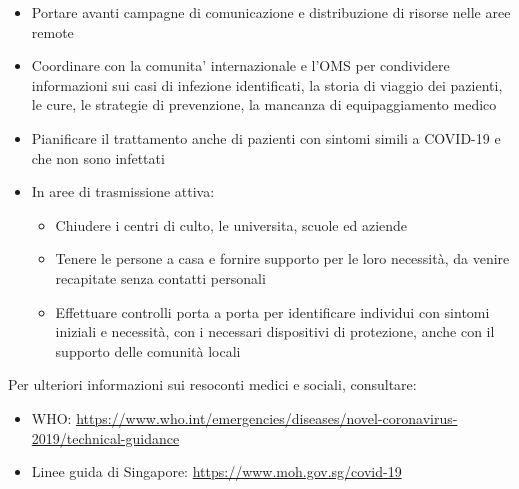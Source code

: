 \documentclass[onecolumn,journal]{IEEEtran}
\begin{document}
\begin{multicols}{2}
\begin{itemize}
\item Portare avanti campagne di comunicazione e distribuzione di risorse nelle aree remote
\item Coordinare con la comunita’ internazionale e l’OMS per condividere informazioni sui casi di infezione identificati, la storia di viaggio dei pazienti, le cure, le strategie di prevenzione, la mancanza di equipaggiamento medico
\item Pianificare il trattamento anche di pazienti con sintomi simili a COVID-19 e che non sono infettati
\item In aree di trasmissione attiva:
  \begin{itemize}
  \item Chiudere i centri di culto, le universita, scuole ed aziende
  \item Tenere le persone a casa e fornire supporto per le loro necessità, da venire recapitate senza contatti personali
  \item Effettuare controlli porta a porta per identificare individui con sintomi iniziali e necessità, con i necessari dispositivi di protezione, anche con il supporto delle comunità locali
  \end{itemize}
\end{itemize}

\end{multicols}

\vspace{2ex}
Per ulteriori informazioni sui resoconti medici e sociali, consultare:
\begin{itemize}
\item WHO: \url{https://www.who.int/emergencies/diseases/novel-coronavirus-2019/technical-guidance}
\item Linee guida di Singapore: \url{https://www.moh.gov.sg/covid-19}
\end{itemize}






% 

\end{document}

